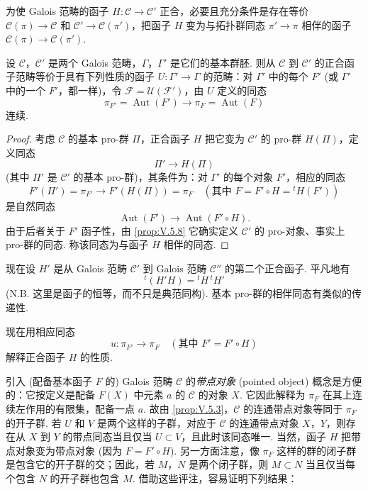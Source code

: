 \begin{corollary}\label{cor:V.6.2}
为使 Galois 范畴的函子 $H \colon \mathcal{C} \to \mathcal{C}'$ 正合，必要且充分条件是存在等价 $\mathcal{C}(\pi) \to \mathcal{C}$ 和 $\mathcal{C}' \to \mathcal{C}(\pi')$，把函子 $H$ 变为与拓扑群同态 $\pi' \to \pi$ 相伴的函子 $\mathcal{C}(\pi) \to \mathcal{C}(\pi')$.
\end{corollary}

\begin{corollary}\label{cor:V.6.3}
设 $\mathcal{C}$，$\mathcal{C}'$ 是两个 Galois 范畴，$\Gamma$，$\Gamma'$ 是它们的基本群胚. 则从 $\mathcal{C}$ 到 $\mathcal{C}'$ 的正合函子范畴等价于具有下列性质的函子 $U \colon \Gamma' \to \Gamma$ 的范畴：对 $\Gamma'$ 中的每个 $F'$ (或 $\Gamma'$ 中的一个 $F'$，都一样)，令 $\mathcal{F} = \mathcal{U}(\mathcal{F}')$，由 $U$ 定义的同态
\[
\pi_{F'} = \operatorname{Aut}(F') \longrightarrow \pi_F = \operatorname{Aut}(F)
\]
连续.
\end{corollary}

\begin{proof}
考虑 $\mathcal{C}$ 的基本 pro-群 $\Pi$，正合函子 $H$ 把它变为 $\mathcal{C}'$ 的 pro-群 $H(\Pi)$，定义同态
\[
\Pi' \longrightarrow H(\Pi)
\]
(其中 $\Pi'$ 是 $\mathcal{C}'$ 的基本 pro-群)，其条件为：对 $\Gamma'$ 的每个对象 $F'$，相应的同态
\[
F'(\Pi') = \pi_{F'} \longrightarrow F'(H(\Pi)) = \pi_F \quad \left(\text{其中 } F = F' \circ H = {}^{t}H(F')\right)
\]
是自然同态
\[
\operatorname{Aut}(F') \longrightarrow \operatorname{Aut}(F' \circ H).
\]
由于后者关于 $F'$ 函子性，由 \ref{prop:V.5.8} 它确实定义 $\mathcal{C}'$ 的 pro-对象、事实上 pro-群的同态. 称该同态为与函子 $H$ 相伴的同态.
\end{proof}

现在设 $H'$ 是从 Galois 范畴 $\mathcal{C}'$ 到 Galois 范畴 $\mathcal{C}''$ 的第二个正合函子. 平凡地有
\[
{}^{t}(H'H) = {}^{t}H\,{}^{t}H'
\]
(N.B. 这里是函子的恒等，而不只是典范同构). 基本 pro-群的相伴同态有类似的传递性.

现在用相应同态
\[
u \colon \pi_{F'} \longrightarrow \pi_F \quad (\text{其中 } F' = F' \circ H)
\]
解释正合函子 $H$ 的性质.

引入 (配备基本函子 $F$ 的) Galois 范畴 $\mathcal{C}$ 的\emph{带点对象} (pointed object) 概念是方便的：它按定义是配备 $F(X)$ 中元素 $a$ 的 $\mathcal{C}$ 的对象 $X$. 它因此解释为 $\pi_F$ 在其上连续左作用的有限集，配备一点 $a$. 故由 \ref{prop:V.5.3}，$\mathcal{C}$ 的连通带点对象等同于 $\pi_F$ 的开子群. 若 $U$ 和 $V$ 是两个这样的子群，对应于 $\mathcal{C}$ 的连通带点对象 $X$，$Y$，则存在从 $X$ 到 $Y$ 的带点同态当且仅当 $U \subset V$，且此时该同态唯一. 当然，函子 $H$ 把带点对象变为带点对象 (因为 $F = F' \circ H$). 另一方面注意，像 $\pi_F$ 这样的群的闭子群是包含它的开子群的交；因此，若 $M$，$N$ 是两个闭子群，则 $M \subset N$ 当且仅当每个包含 $N$ 的开子群也包含 $M$. 借助这些评注，容易证明下列结果：

